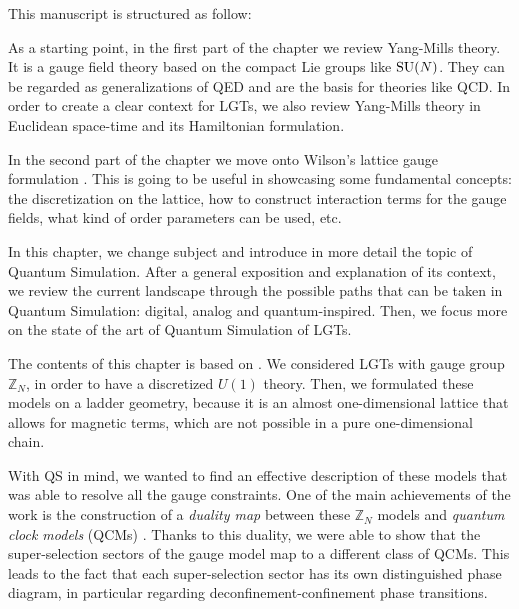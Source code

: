 \noindent This manuscript is structured as follow:
\begin{description}[labelsep=1.1em]
    \item[Chap.~\ref{chap:introduction_to_lattice_gauge_theories}]
        As a starting point, in the first part of the chapter we review Yang-Mills theory.
        It is a gauge field theory based on the compact Lie groups like $\text{SU}(N)$.
        They can be regarded as generalizations of QED and are the basis for theories like QCD.
        In order to create a clear context for LGTs, we also review Yang-Mills theory in Euclidean space-time and its Hamiltonian formulation.

        In the second part of the chapter we move onto Wilson's lattice gauge formulation \cite{wilson1974confinement}.
        This is going to be useful in showcasing some fundamental concepts: the discretization on the lattice, how to construct interaction terms for the gauge fields, what kind of order parameters can be used, etc.


    \item[Chap.~\ref{chap:quantum_simulation_of_lattice_gauge_theories}]
        In this chapter, we change subject and introduce in more detail the topic of Quantum Simulation.
        After a general exposition and explanation of its context, we review the current landscape through the possible paths that can be taken in Quantum Simulation: digital, analog and quantum-inspired.
        Then, we focus more on the state of the art of Quantum Simulation of LGTs.


    \item[Chap.~\ref{chap:dualities_in_abelian_models}]
        The contents of this chapter is based on \cite{pradhan2022ladder}.
        We considered LGTs with gauge group $\mathbb{Z}_N$, in order to have a discretized $U(1)$ theory.
        Then, we formulated these models on a ladder geometry, because it is an almost one-dimensional lattice that allows for magnetic terms, which are not possible in a pure one-dimensional chain.

        With QS in mind, we wanted to find an effective description of these models that was able to resolve all the gauge constraints.
        One of the main achievements of the work is the construction of a \emph{duality map} between these $\mathbb{Z}_N$ models and \emph{quantum clock models} (QCMs) \cite{ortiz2012dualities}.
        Thanks to this duality, we were able to show that the super-selection sectors of the gauge model map to a different class of QCMs.
        This leads to the fact that each super-selection sector has its own distinguished phase diagram, in particular regarding deconfinement-confinement phase transitions.



\end{description}
